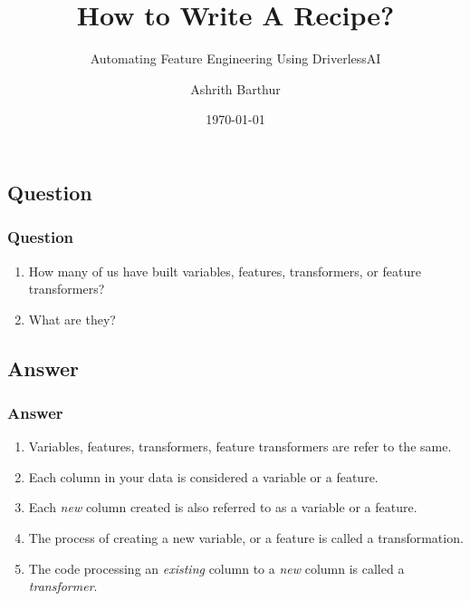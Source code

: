 \documentclass[11pt,
               aspectratio=169,
               hyperref={colorlinks}
               ]{beamer}
\author{Ashrith Barthur}
\title{How to Write A Recipe?}
\subtitle{Automating Feature Engineering Using DriverlessAI}
\institute{\href{https://www.h2o.ai}{H\textsubscript{2}O.ai}}
\date{\today}
\begin{document}
	
	\maketitle
	
	
		
		

	\subsection{Question}
	\begin{frame}
		\frametitle{Question}
		\begin{enumerate}
			\item How many of us have built variables, features, transformers, or feature transformers?
			\item What are they?
		\end{enumerate}
	\end{frame}
	\subsection{Answer}
	\begin{frame}
		\frametitle{Answer}
		\begin{enumerate}
			\item Variables, features, transformers, feature transformers are refer to the same.
			\item Each column in your data is considered a variable or a feature.
			\item Each \textit{new} column created is also referred to as a variable or a feature.
			\item The process of creating a new variable, or a feature is called a transformation. 
			\item The code processing an \textit{existing} column to a \textit{new} column is called a \textit{transformer}.
		\end{enumerate}
	\end{frame}
\end{document}
